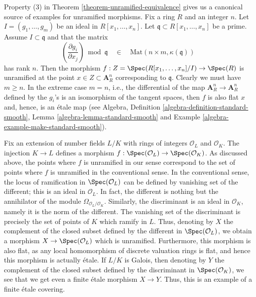 \begin{example}
\label{example-standard-etale}
Property (3) in
Theorem \ref{theorem-unramified-equivalence}
gives us a canonical source of examples for unramified morphisms.
Fix a ring $R$ and an integer $n$. Let $I = (g_1, \ldots, g_m)$ be an
ideal in $R[x_1, \ldots, x_n]$. Let $\mathfrak q \subset R[x_1, \ldots, x_n]$
be a prime. Assume $I \subset \mathfrak q$ and that the matrix
$$
\left(\frac{\partial g_i}{\partial x_j}\right) \bmod \mathfrak q
\quad\in\quad
\text{Mat}(n \times m, \kappa(\mathfrak q))
$$
has rank $n$. Then the morphism
$f : Z = \Spec(R[x_1, \ldots, x_n]/I) \to \Spec(R)$
is unramified at the point $x \in Z \subset \mathbf{A}^n_R$ corresponding
to $\mathfrak q$. Clearly we must have $m \geq n$.
In the extreme case $m = n$, i.e., the differential of the map
$\mathbf{A}^n_R \to \mathbf{A}^n_R$ defined by the $g_i$'s
is an isomorphism of the tangent spaces, then $f$ is also flat
$x$ and, hence, is an \'etale map (see Algebra,
Definition \ref{algebra-definition-standard-smooth},
Lemma \ref{algebra-lemma-standard-smooth} and
Example \ref{algebra-example-make-standard-smooth}).
\end{example}

\begin{example}
\label{example-number-theory-etale}
Fix an extension of number fields $L/K$ with rings of integers
$\mathcal{O}_L$ and $\mathcal{O}_K$. The injection $K \to L$ defines a
morphism $f : \Spec(\mathcal{O}_L) \to \Spec(\mathcal{O}_K)$.
As discussed above, the points where $f$ is unramified in our sense
correspond to the set of points where $f$ is unramified in the conventional
sense. In the conventional sense, the locus of ramification in
$\Spec(\mathcal{O}_L)$ can be defined by vanishing set of the
different; this is an ideal in $\mathcal{O}_L$. In fact, the different is
nothing but the annihilator of the module
$\Omega_{\mathcal{O}_L/\mathcal{O}_K}$. Similarly, the
discriminant is an ideal in $\mathcal{O}_K$, namely it is the
norm of the different.
The vanishing set of the discriminant is precisely the set
of points of $K$ which ramify in $L$.
Thus, denoting by $X$ the complement of the closed subset
defined by the different in $\Spec(\mathcal{O}_L)$,
we obtain a morphism $X \to \Spec(\mathcal{O}_L)$ which is unramified.
Furthermore, this morphism is also flat, as any local homomorphism
of discrete valuation rings is flat, and hence this morphism is
actually \'etale. If $L/K$ is Galois, then denoting by
$Y$ the complement of the closed subset defined by the discriminant in
$\Spec(\mathcal{O}_K)$, we see that we get even a
finite \'etale morphism $X \to Y$.
Thus, this is an example of a finite \'etale covering.
\end{example}





